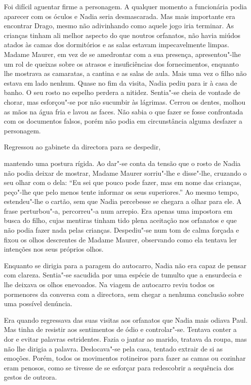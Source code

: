 Foi difícil aguentar firme a personagem. A qualquer momento a
funcionária podia aparecer com os óculos e Nadia seria desmascarada. Mas
mais importante era encontrar Drago, mesmo não adivinhando como aquele
jogo iria terminar. As crianças tinham ali melhor aspecto do que noutros
orfanatos, não havia miúdos atados às camas dos dormitórios e as salas
estavam impecavelmente limpas. Madame Maurer, em vez de se amedrontar
com a sua presença, apresentou"-lhe um rol de queixas sobre os atrasos e
insuficiências dos fornecimentos, enquanto lhe mostrava as camaratas, a
cantina e as salas de aula. Mais uma vez o filho não estava em lado
nenhum. Quase no fim da visita, Nadia pediu para ir à casa de banho. O
seu rosto no espelho perdera a nitidez. Sentia"-se cheia de vontade de
chorar, mas esforçou"-se por não sucumbir às lágrimas. Cerrou os dentes,
molhou as mãos na água fria e lavou as faces. Não sabia o que fazer se
fosse confrontada com os documentos falsos, porém não podia em
circunstância alguma desfazer a personagem.

Regressou ao gabinete da directora para se despedir,

mantendo uma postura rígida. Ao dar"-se conta da tensão que o rosto de
Nadia não podia deixar de mostrar, Madame Maurer sorriu"-lhe e disse"-lhe,
cruzando o seu olhar com o dela: ``Eu sei que pouco pode fazer, mas em
nome das crianças, peço"-lhe que pelo menos tente informar os seus
superiores.'' Ao mesmo tempo, estendeu"-lhe o cartão, sem que Nadia
percebesse se chegara a olhar para ele. A frase perturbou"-a, percorreu"-a
num arrepio. Era apenas uma impostora em busca do filho, cujas mentiras
tinham tido plena aceitação nos orfanatos e que não podia
fazer nada pelas crianças. Despediu"-se num tom de calma forçada e fixou
os olhos descrentes de Madame Maurer, observando como ela tentava ler
intenções nos seus próprios olhos.

Enquanto se dirigia para a paragem do autocarro, Nadia não era capaz de
pensar com clareza. Sentia"-se sacudida por uma espécie de tumulto que a
ensurdecia e lhe deixava os olhos enevoados. Na viagem de autocarro
reviu todos os pormenores da conversa com a directora, sem chegar a
nenhuma conclusão sobre uma possível denúncia.

Era quando regressava das suas visitas aos orfanatos que Nadia mais
odiava Paul. Mas tinha de resistir aos sentimentos de ódio e
controlar"-se. Tentava conter a dor e evitar palavras estridentes. Fazia
o jantar ao marido, tratava da roupa, mas não lhe dirigia a palavra.
Deslocava"-se pela casa, tentado extrair de si as emoções. Porém, todos
os movimentos rotineiros para fazer as camas ou cozinhar eram penosos,
como se tivesse de se esforçar para redescobrir a sequência dos gestos
de outrora.

